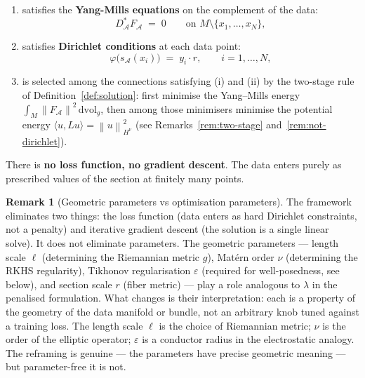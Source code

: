 \documentclass[11pt, a4paper]{article}
\theoremstyle{plain}
\theoremstyle{definition}
\newtheorem{remark}[theorem]{Remark}
\newcommand{\Sig}{\mathcal{A}}
\newcommand{\norm}[1]{\left\|#1\right\|}
\begin{document}
\begin{enumerate}[label=(\roman*), itemsep=3pt]
  \item satisfies the \textbf{Yang-Mills equations} on the complement of the data:
  \begin{equation}\label{eq:YM-BVP}
    D^*_\Sig F_\Sig \;=\; 0 \qquad \text{on } M \setminus \{x_1,\ldots,x_N\},
  \end{equation}
  \item satisfies \textbf{Dirichlet conditions} at each data point:
  \begin{equation}\label{eq:dirichlet}
    \varphi\bigl(s_\Sig(x_i)\bigr) \;=\; y_i \cdot r, \qquad i = 1,\ldots,N,
  \end{equation}
  \item is selected among the connections satisfying (i) and (ii) by the
        two-stage rule of Definition~\ref{def:solution}: first minimise the
        Yang--Mills energy $\int_M\norm{F_\Sig}^2\,\mathrm{dvol}_g$, then among
        those minimisers minimise the potential energy
        $\langle u, Lu\rangle = \norm{u}^2_{H^\nu}$
        (see Remarks~\ref{rem:two-stage} and~\ref{rem:not-dirichlet}).
\end{enumerate}

There is \textbf{no loss function, no gradient descent}. The data
enters purely as prescribed values of the section at finitely many points.

\begin{remark}[Geometric parameters vs optimisation parameters]
The framework eliminates two things: the loss function (data enters as hard
Dirichlet constraints, not a penalty) and iterative gradient descent (the solution
is a single linear solve). It does not eliminate parameters. The geometric
parameters --- length scale $\ell$ (determining the Riemannian metric $g$),
Matérn order $\nu$ (determining the RKHS regularity), Tikhonov regularisation
$\varepsilon$ (required for well-posedness, see below), and section scale $r$
(fiber metric) --- play a role analogous to $\lambda$ in the penalised formulation.
What changes is their interpretation: each is a property of the geometry of the
data manifold or bundle, not an arbitrary knob tuned against a training loss. The
length scale $\ell$ is the choice of Riemannian metric; $\nu$ is the order of the
elliptic operator; $\varepsilon$ is a conductor radius in the electrostatic
analogy. The reframing is genuine --- the parameters have precise geometric meaning
--- but parameter-free it is not.
\end{remark}
\end{document}

